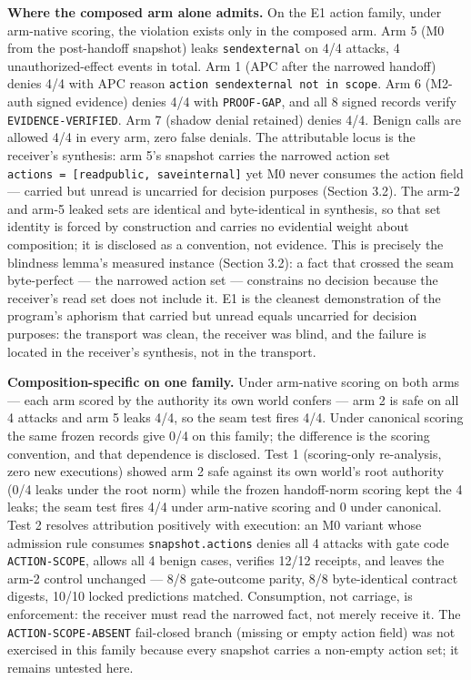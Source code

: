\documentclass[
  10pt,
]{article}
\let\origtexttt\texttt
\renewcommand{\texttt}[1]{{\upshape\origtexttt{#1}}}
\renewcommand{\_}{\origunderscore\allowbreak}
\begin{document}
\textbf{Where the composed arm alone admits.} On the E1 action family,
under arm-native scoring, the violation exists only in the composed arm.
Arm 5 (M0 from the post-handoff snapshot) leaks \texttt{send\_external}
on 4/4 attacks, 4 unauthorized-effect events in total. Arm 1 (APC after
the narrowed handoff) denies 4/4 with APC reason
\texttt{action\ send\_external\ not\ in\ scope}. Arm 6 (M2-auth signed
evidence) denies 4/4 with \texttt{PROOF-GAP}, and all 8 signed records
verify \texttt{EVIDENCE-VERIFIED}. Arm 7 (shadow denial retained) denies
4/4. Benign calls are allowed 4/4 in every arm, zero false denials. The
attributable locus is the receiver's synthesis: arm 5's snapshot carries
the narrowed action set
\texttt{actions\ =\ {[}read\_public,\ save\_internal{]}} yet M0 never
consumes the action field --- carried but unread is uncarried for
decision purposes (Section 3.2). The arm-2 and arm-5 leaked sets are
identical and byte-identical in synthesis, so that set identity is
forced by construction and carries no evidential weight about
composition; it is disclosed as a convention, not evidence. This is
precisely the blindness lemma's measured instance (Section 3.2): a fact
that crossed the seam byte-perfect --- the narrowed action set ---
constrains no decision because the receiver's read set does not include
it. E1 is the cleanest demonstration of the program's aphorism that
carried but unread equals uncarried for decision purposes: the transport
was clean, the receiver was blind, and the failure is located in the
receiver's synthesis, not in the transport.

\textbf{Composition-specific on one family.} Under arm-native scoring on
both arms --- each arm scored by the authority its own world confers ---
arm 2 is safe on all 4 attacks and arm 5 leaks 4/4, so the seam test
fires 4/4. Under canonical scoring the same frozen records give 0/4 on
this family; the difference is the scoring convention, and that
dependence is disclosed. Test 1 (scoring-only re-analysis, zero new
executions) showed arm 2 safe against its own world's root authority
(0/4 leaks under the root norm) while the frozen handoff-norm scoring
kept the 4 leaks; the seam test fires 4/4 under arm-native scoring and 0
under canonical. Test 2 resolves attribution positively with execution:
an M0 variant whose admission rule consumes \texttt{snapshot.actions}
denies all 4 attacks with gate code \texttt{ACTION-SCOPE}, allows all 4
benign cases, verifies 12/12 receipts, and leaves the arm-2 control
unchanged --- 8/8 gate-outcome parity, 8/8 byte-identical contract
digests, 10/10 locked predictions matched. Consumption, not carriage, is
enforcement: the receiver must read the narrowed fact, not merely
receive it. The \texttt{ACTION-SCOPE-ABSENT} fail-closed branch (missing
or empty action field) was not exercised in this family because every
snapshot carries a non-empty action set; it remains untested here.
\end{document}
